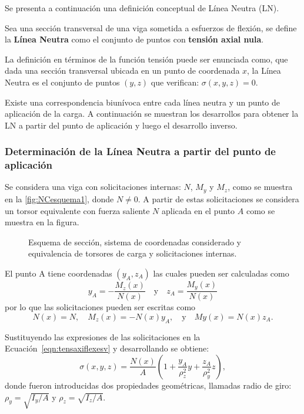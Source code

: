 Se presenta a continuación una definición conceptual de Línea Neutra (LN).

{Sea una sección transversal de una viga sometida a esfuerzos de flexión, se define la \textbf{Línea Neutra} como el conjunto de puntos con \textbf{tensión axial nula}.}

La definición en términos de la función tensión puede ser enunciada como, que dada una sección transversal ubicada en un punto de coordenada $x$, la Línea Neutra es el conjunto de puntos $(y,z)$ que verifican: $\sigma(x,y,z) = 0$.

Existe una correspondencia biunívoca entre cada línea neutra y un punto de aplicación de la carga. %
%
A continuación se muestran los desarrollos para obtener la LN a partir del punto de aplicación y luego el desarrollo inverso.

\subsubsection{Determinación de la Línea Neutra a partir del punto de aplicación}

Se considera una viga con solicitaciones internas: $N$, $M_y$ y $M_z$, como se muestra en la  \autoref{fig:NCesquema1}, donde $N\neq 0 $. A partir de estas solicitaciones se considera un torsor equivalente con fuerza saliente $N$ aplicada en el punto $A$ como se muestra en la figura.

\begin{figure}[htb]
	\centering
	\def\svgwidth{0.9\textwidth}
	
	\caption{Esquema de sección, sistema de coordenadas considerado y equivalencia de torsores de carga y solicitaciones internas.}
	\label{fig:NCesquema1}
\end{figure}

El punto A tiene coordenadas $(y_A,z_A)$ las cuales pueden ser calculadas como
%
\begin{equation}
y_A = -\frac{M_z(x)}{N(x)}  \quad  \text{y} \quad 
z_A = \frac{M_y(x)}{N(x)}
\end{equation}
%
por lo que las solicitaciones pueden ser escritas como
\begin{equation}
	N(x) = N, \quad M_z(x) = -N(x) y_A,\quad  \text{y} \quad 
	My(x) = N(x) z_A.
\end{equation}
%

Sustituyendo las expresiones de las solicitaciones en la Ecuación~\eqref{eqn:tensaxiflexesv} y desarrollando se obtiene:
%
\begin{equation}
\sigma(x,y,z) = \frac{N(x)}{A}
\left(1 +  \frac{ y_A}{\rho_z^2} y +  \frac{ z_A}{\rho_y^2} z \right),
\end{equation}
%
donde fueron introducidas dos propiedades geométricas, llamadas radio de giro: $\rho_y = \sqrt{ I_y / A}$ y $\rho_z = \sqrt{ I_z / A}$. %
%

